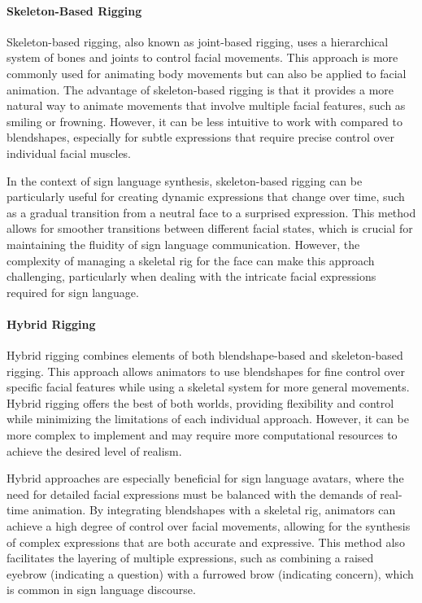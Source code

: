 \documentclass[../../main.tex]{subfiles}
\begin{document}
\paragraph{Skeleton-Based Rigging}

Skeleton-based rigging, also known as joint-based rigging, uses a hierarchical system of bones and joints to control facial movements. This approach is more commonly used for animating body movements but can also be applied to facial animation. The advantage of skeleton-based rigging is that it provides a more natural way to animate movements that involve multiple facial features, such as smiling or frowning. However, it can be less intuitive to work with compared to blendshapes, especially for subtle expressions that require precise control over individual facial muscles.

In the context of sign language synthesis, skeleton-based rigging can be particularly useful for creating dynamic expressions that change over time, such as a gradual transition from a neutral face to a surprised expression. This method allows for smoother transitions between different facial states, which is crucial for maintaining the fluidity of sign language communication. However, the complexity of managing a skeletal rig for the face can make this approach challenging, particularly when dealing with the intricate facial expressions required for sign language.

\paragraph{Hybrid Rigging}

Hybrid rigging combines elements of both blendshape-based and skeleton-based rigging. This approach allows animators to use blendshapes for fine control over specific facial features while using a skeletal system for more general movements. Hybrid rigging offers the best of both worlds, providing flexibility and control while minimizing the limitations of each individual approach. However, it can be more complex to implement and may require more computational resources to achieve the desired level of realism.

Hybrid approaches are especially beneficial for sign language avatars, where the need for detailed facial expressions must be balanced with the demands of real-time animation. By integrating blendshapes with a skeletal rig, animators can achieve a high degree of control over facial movements, allowing for the synthesis of complex expressions that are both accurate and expressive. This method also facilitates the layering of multiple expressions, such as combining a raised eyebrow (indicating a question) with a furrowed brow (indicating concern), which is common in sign language discourse.
\end{document}
